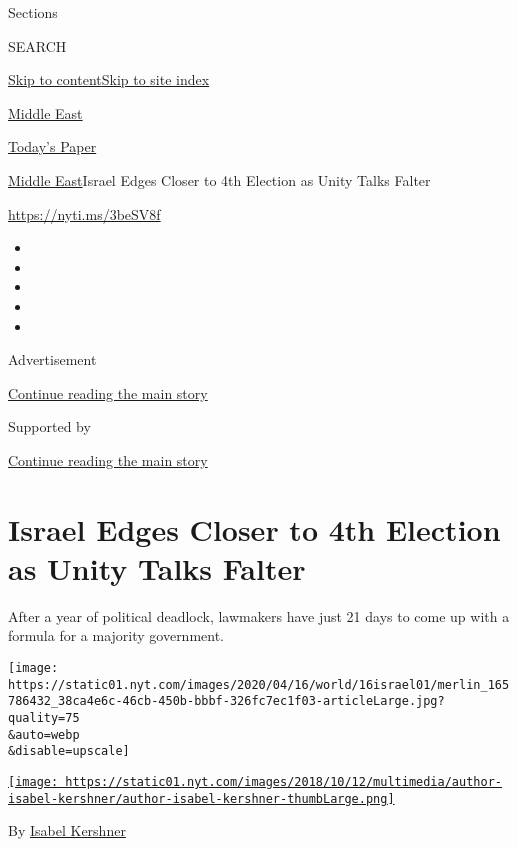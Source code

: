 Sections

SEARCH

\protect\hyperlink{site-content}{Skip to
content}\protect\hyperlink{site-index}{Skip to site index}

\href{https://www.nytimes.com/section/world/middleeast}{Middle East}

\href{https://myaccount.nytimes.com/auth/login?response_type=cookie\&client_id=vi}{}

\href{https://www.nytimes.com/section/todayspaper}{Today's Paper}

\href{/section/world/middleeast}{Middle East}\textbar{}Israel Edges
Closer to 4th Election as Unity Talks Falter

\url{https://nyti.ms/3beSV8f}

\begin{itemize}
\item
\item
\item
\item
\item
\end{itemize}

Advertisement

\protect\hyperlink{after-top}{Continue reading the main story}

Supported by

\protect\hyperlink{after-sponsor}{Continue reading the main story}

\hypertarget{israel-edges-closer-to-4th-election-as-unity-talks-falter}{%
\section{Israel Edges Closer to 4th Election as Unity Talks
Falter}\label{israel-edges-closer-to-4th-election-as-unity-talks-falter}}

After a year of political deadlock, lawmakers have just 21 days to come
up with a formula for a majority government.

\texttt{[image: https://static01.nyt.com/images/2020/04/16/world/16israel01/merlin\_165786432\_38ca4e6c-46cb-450b-bbbf-326fc7ec1f03-articleLarge.jpg?quality=75\\\&auto=webp\\\&disable=upscale]}

\href{https://www.nytimes.com/by/isabel-kershner}{\texttt{[image: https://static01.nyt.com/images/2018/10/12/multimedia/author-isabel-kershner/author-isabel-kershner-thumbLarge.png]}}

By \href{https://www.nytimes.com/by/isabel-kershner}{Isabel Kershner}


